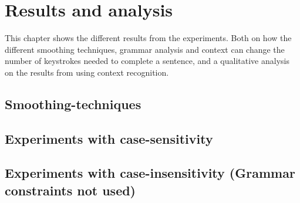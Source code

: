 \section{Results and analysis}
This chapter shows the different results from the experiments. Both on how the different smoothing techniques, grammar analysis and context can change the number of keystrokes needed to complete a sentence, and a qualitative analysis on the results from using context recognition.

\subsection{Smoothing-techniques}
\vspace{1em}
\subsection*{Experiments with case-sensitivity}
\subsection*{Experiments with case-insensitivity (Grammar constraints not used)}